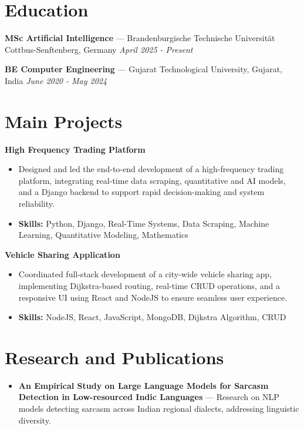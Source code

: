 \documentclass[a4paper,10pt]{article}
\begin{document}
\section*{Education}
\textbf{MSc Artificial Intelligence} — Brandenburgische Technische Universität Cottbus-Senftenberg, Germany \hfill \textit{April 2025 - Present}\par
\vspace{1.5pt}
\textbf{BE Computer Engineering} — Gujarat Technological University, Gujarat, India \hfill \textit{June 2020 - May 2024}\par

\section*{Main Projects}
\textbf{High Frequency Trading Platform}\par
\vspace{1pt}
\begin{itemize}
  \item Designed and led the end-to-end development of a high-frequency trading platform, integrating real-time data scraping, quantitative and AI models, and a Django backend to support rapid decision-making and system reliability.
  \item \textbf{Skills:} Python, Django, Real-Time Systems, Data Scraping, Machine Learning, Quantitative Modeling, Mathematics
\end{itemize}
\vspace{3pt}
\textbf{Vehicle Sharing Application}\par
\vspace{1pt}
\begin{itemize}
  \item Coordinated full-stack development of a city-wide vehicle sharing app, implementing Dijkstra-based routing, real-time CRUD operations, and a responsive UI using React and NodeJS to ensure seamless user experience.
  \item \textbf{Skills:} NodeJS, React, JavaScript, MongoDB, Dijkstra Algorithm, CRUD
\end{itemize}

\section*{Research and Publications}
\begin{itemize}
\item \textbf{An Empirical Study on Large Language Models for Sarcasm Detection in Low-resourced Indic Languages} — Research on NLP models detecting sarcasm across Indian regional dialects, addressing linguistic diversity.
\end{itemize}
\end{document}
